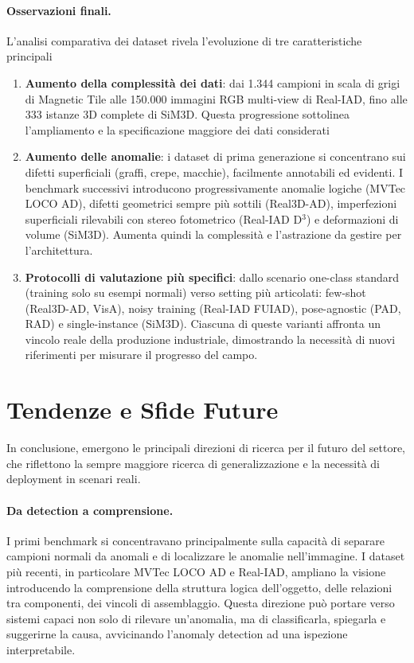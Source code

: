 \paragraph{Osservazioni finali.}
L'analisi comparativa dei dataset rivela l'evoluzione di tre caratteristiche principali

\begin{enumerate}
    \item \textbf{Aumento della complessità dei dati}: dai 1.344 campioni in scala di grigi di Magnetic Tile alle 150.000 immagini RGB multi-view di Real-IAD, fino alle 333 istanze 3D complete di SiM3D. Questa progressione sottolinea l'ampliamento e la specificazione maggiore dei dati considerati
    \item \textbf{Aumento delle anomalie}: i dataset di prima generazione si concentrano sui difetti superficiali (graffi, crepe, macchie), facilmente annotabili ed evidenti. I benchmark successivi introducono progressivamente anomalie logiche (MVTec LOCO AD), difetti geometrici sempre più sottili (Real3D-AD), imperfezioni superficiali rilevabili con stereo fotometrico (Real-IAD D$^3$) e deformazioni di volume (SiM3D). Aumenta quindi la complessità e l'astrazione da gestire per l'architettura.
    \item \textbf{Protocolli di valutazione più specifici}: dallo scenario one-class standard (training solo su esempi normali) verso setting più articolati: few-shot (Real3D-AD, VisA), noisy training (Real-IAD FUIAD), pose-agnostic (PAD, RAD) e single-instance (SiM3D). Ciascuna di queste varianti affronta un vincolo reale della produzione industriale, dimostrando la necessità di nuovi riferimenti per misurare il progresso del campo.
\end{enumerate}

\section{Tendenze e Sfide Future}
\label{sec:tendenze_future}


In conclusione, emergono le principali direzioni di ricerca per il futuro del settore, che riflettono la sempre maggiore ricerca di generalizzazione e la necessità di deployment in scenari reali.

\paragraph{Da detection a comprensione.}
I primi benchmark si concentravano principalmente sulla capacità di separare campioni normali da anomali e di localizzare le anomalie nell’immagine. I dataset più recenti, in particolare MVTec LOCO AD e Real-IAD, ampliano la visione introducendo la comprensione della struttura logica dell'oggetto, delle relazioni tra componenti, dei vincoli di assemblaggio. Questa direzione può portare verso sistemi capaci non solo di rilevare un'anomalia, ma di classificarla, spiegarla e suggerirne la causa, avvicinando l'anomaly detection ad una ispezione interpretabile.

